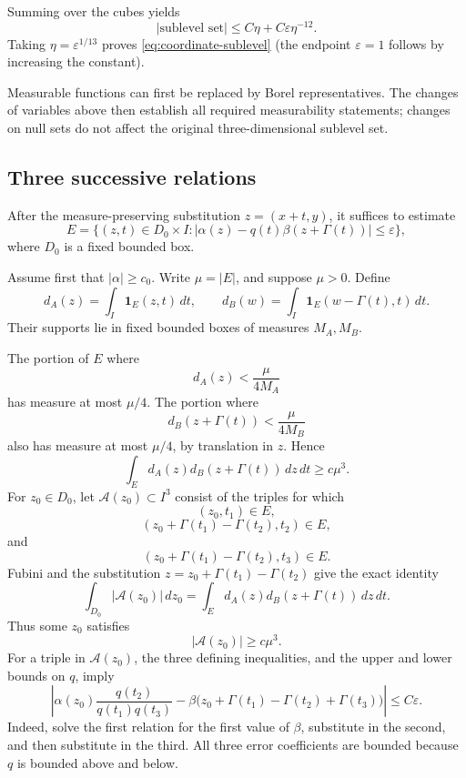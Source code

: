 \documentclass[11pt,a4paper]{article}
\newcommand{\ind}{\mathbf 1}
\begin{document}
Summing over the cubes yields
\[
|\text{sublevel set}|\leq C\eta+C\varepsilon\eta^{-12}.
\]
Taking $\eta=\varepsilon^{1/13}$ proves
\eqref{eq:coordinate-sublevel} (the endpoint $\varepsilon=1$ follows by
increasing the constant).

Measurable functions can first be replaced by Borel representatives. The
changes of variables above then establish all required measurability
statements; changes on null sets do not affect the original
three-dimensional sublevel set.

\subsection{Three successive relations}

After the measure-preserving substitution $z=(x+t,y)$, it suffices to
estimate
\[
E=\{(z,t)\in D_0\times I:
|\alpha(z)-q(t)\beta(z+\Gamma(t))|\leq\varepsilon\},
\tag{3.11}\label{eq:incidence-set}
\]
where $D_0$ is a fixed bounded box.

Assume first that $|\alpha|\geq c_0$. Write $\mu=|E|$, and suppose
$\mu>0$. Define
\[
d_A(z)=\int_I\ind_E(z,t)\,dt,\qquad
 d_B(w)=\int_I\ind_E(w-\Gamma(t),t)\,dt.
\]
Their supports lie in fixed bounded boxes of measures $M_A,M_B$.

The portion of $E$ where
\[
d_A(z)<\frac{\mu}{4M_A}
\]
has measure at most $\mu/4$. The portion where
\[
d_B(z+\Gamma(t))<\frac{\mu}{4M_B}
\]
also has measure at most $\mu/4$, by translation in $z$. Hence
\[
\int_Ed_A(z)d_B(z+\Gamma(t))\,dz\,dt\geq c\mu^3.
\tag{3.12}\label{eq:three-edge-count}
\]
For $z_0\in D_0$, let $\mathcal A(z_0)\subset I^3$ consist of the triples
for which
\[
(z_0,t_1)\in E,
\]
\[
(z_0+\Gamma(t_1)-\Gamma(t_2),t_2)\in E,
\]
and
\[
(z_0+\Gamma(t_1)-\Gamma(t_2),t_3)\in E.
\]
Fubini and the substitution $z=z_0+\Gamma(t_1)-\Gamma(t_2)$ give the exact
identity
\[
\int_{D_0}|\mathcal A(z_0)|\,dz_0
=\int_Ed_A(z)d_B(z+\Gamma(t))\,dz\,dt.
\]
Thus some $z_0$ satisfies
\[
|\mathcal A(z_0)|\geq c\mu^3.
\tag{3.13}\label{eq:large-fiber}
\]
For a triple in $\mathcal A(z_0)$, the three defining inequalities, and the
upper and lower bounds on $q$, imply
\[
\left|\alpha(z_0)\frac{q(t_2)}{q(t_1)q(t_3)}
-\beta\bigl(z_0+\Gamma(t_1)-\Gamma(t_2)+\Gamma(t_3)\bigr)\right|
\leq C\varepsilon.
\tag{3.14}\label{eq:three-relations}
\]
Indeed, solve the first relation for the first value of $\beta$, substitute
in the second, and then substitute in the third. All three error
coefficients are bounded because $q$ is bounded above and below.
\end{document}
